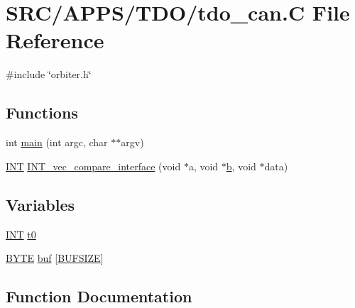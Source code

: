 \hypertarget{tdo__can_8_c}{}\section{S\+R\+C/\+A\+P\+P\+S/\+T\+D\+O/tdo\+\_\+can.C File Reference}
\label{tdo__can_8_c}
{\ttfamily \#include \char`\"{}orbiter.\+h\char`\"{}}\newline
\subsection*{Functions}
\begin{DoxyCompactItemize}
\item 
int \mbox{\hyperlink{tdo__can_8_c_a3c04138a5bfe5d72780bb7e82a18e627}{main}} (int argc, char $\ast$$\ast$argv)
\item 
\mbox{\hyperlink{galois_8h_a09fddde158a3a20bd2dcadb609de11dc}{I\+NT}} \mbox{\hyperlink{tdo__can_8_c_afb40e970effa2a1cb848a1531dfb03f6}{I\+N\+T\+\_\+vec\+\_\+compare\+\_\+interface}} (void $\ast$a, void $\ast$\mbox{\hyperlink{alphabet2_8_c_a148e3876077787926724625411d6e7a9}{b}}, void $\ast$data)
\end{DoxyCompactItemize}
\subsection*{Variables}
\begin{DoxyCompactItemize}
\item 
\mbox{\hyperlink{galois_8h_a09fddde158a3a20bd2dcadb609de11dc}{I\+NT}} \mbox{\hyperlink{tdo__can_8_c_a4268f4fe222ffb119218a0199f5e1904}{t0}}
\item 
\mbox{\hyperlink{galois_8h_ab6cc7b4aeb6ea31aba2b3fbfc83ff5e6}{B\+Y\+TE}} \mbox{\hyperlink{tdo__can_8_c_a271269b6eb6a530467c611f562cad9ee}{buf}} \mbox{[}\mbox{\hyperlink{galois_8h_aeca034f67218340ecb2261a22c2f3dcd}{B\+U\+F\+S\+I\+ZE}}\mbox{]}
\end{DoxyCompactItemize}


\subsection{Function Documentation}
\mbox{\label{tdo__can_8_c_afb40e970effa2a1cb848a1531dfb03f6}} 
